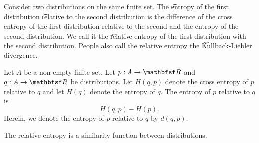 
\sbasic






































\sstart
{}



Consider two distributions on the same finite set.
The \t{entropy} of the first distribution \t{relative}{} to the second distribution is the difference of the cross entropy of the first distribution relative to the second and the entropy of the second distribution.
We call it the \t{relative entropy} of the first distribution with the second distribution.
People also call the relative entropy the \t{Kullback-Liebler divergence}.


Let $A$ be a non-empty finite set.
Let $p: A \to \R$ and $q: A \to \R$ be distributions.
Let $H(q, p)$ denote the cross entropy of $p$ relative to $q$ and let $H(q)$ denote the entropy of $q$.
The entropy of $p$ relative to $q$ is $$H(q, p) - H(p).$$
Herein, we denote the entropy of $p$ relative to $q$ by $d(q, p)$.


The relative entropy is a similarity function between distributions.

